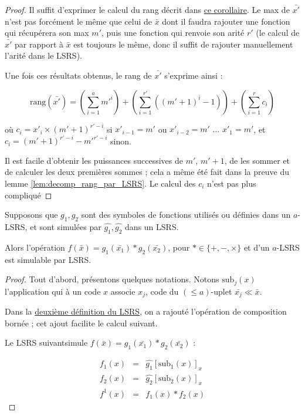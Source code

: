 \documentclass{report}
\newcommand{\leqa}{\left( \leqslant a \right)}
\begin{document}
	\begin{proof}
		Il suffit d'exprimer le calcul du rang décrit dans \hyperref[coro:rang_bon_ordre]{ce corollaire}. Le max de $\bar{x'}$ n'est pas forcément le même que celui de $\bar{x}$ dont il faudra rajouter une fonction qui récupérera son max $m'$, puis une fonction qui renvoie son arité $r'$ (le calcul de $\bar{x'}$ par rapport à $\bar{x}$ est toujours le même, donc il suffit de rajouter manuellement l'arité dans le LSRS). 
		
		Une fois ces résultats obtenus, le rang de $\bar{x'}$ s'exprime ainsi :
		
		\begin{equation}
			\text{rang}\left(\bar{x'}\right) = \left( \sum_{i=1}^{a} m'^i \right) + \left( \sum_{i=1}^{r'} \left( \left(m'+1\right)^i -1 \right) \right) + \left(\sum_{i=1}^{r} c_i \right)
		\end{equation}
		
		où $c_i = x'_i \times \left(m'+1\right)^{r'-i}$ si $x'_{i-1} = m'$ ou $x'_{i-2} = m'$ $\dots$ $x'_{1} = m'$, et $c_i = \left(m'+1\right)^{r'-i}-m'^{r'-i}$ sinon.
		
		Il est facile d'obtenir les puissances successives de $m'$, $m'+1$, de les sommer et de calculer les deux premières sommes ; cela a même été fait dans la preuve du lemme \ref{lem:decomp_rang_par_LSRS}. Le calcul des $c_i$ n'est pas plus compliqué 
	\end{proof}
	
	
	\begin{lemma}
		\label{lem:operation_simulable}
		Supposons que $g_1, g_2$ sont des symboles de fonctions utilisés ou définies dans un $a$-LSRS, et sont simulées par $\hat{g_1},\hat{g_2}$ dans un LSRS.
		
		Alors l'opération $f\left(\bar{x}\right) = g_1\left(\bar{x_1}\right) * g_2\left(\bar{x_2}\right)$, pour $* \in \{+, -, \times \}$ et d'un $a$-LSRS est simulable par LSRS.
	\end{lemma}
	
	\begin{proof}
		Tout d'abord, présentons quelques notations. Notons $\text{sub}_j(x)$ l'application qui à un code $x$ associe $x_j$, code du $\leqa$-uplet $\bar{x_j} \ll \bar{x}$. 
		
		Dans la \hyperref[def:LSRS_2]{deuxième définition du LSRS}, on a rajouté l'opération de composition bornée ; cet ajout facilite le calcul suivant. 
		
		Le LSRS suivant\footnotemark  simule $f\left(\bar{x}\right) = g_1\left(\bar{x_1}\right) * g_2\left(\bar{x_2}\right)$ :
			
		
		\begin{eqnarray}
			f_1(x) & = & \hat{g_1}\left[ \text{sub}_1(x) \right]_x \\
			f_2(x) & = & \hat{g_2}\left[ \text{sub}_2(x) \right]_x \\
			f^1(x) & = & f_1(x) * f_2(x) 
		\end{eqnarray}
	\end{proof}
	
\end{document}

